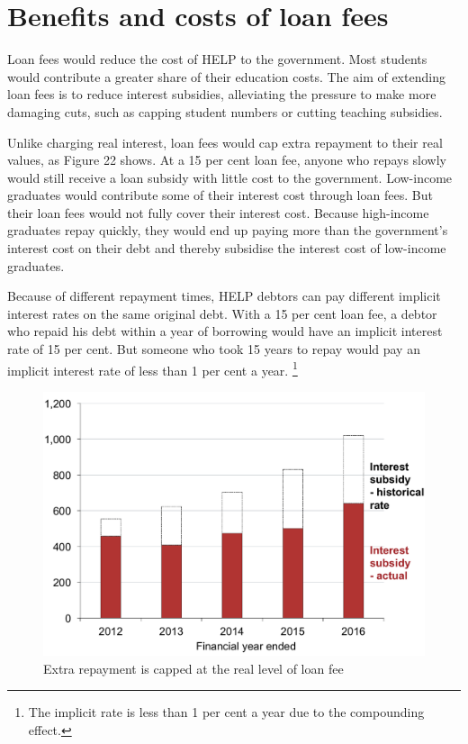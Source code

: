 \documentclass[embargoed]{grattan}
\begin{document}
\section{Benefits and costs of loan fees}\label{sec:benefits-and-costs-of-loan-fees}

Loan fees would reduce the cost of HELP to the government.
Most students would contribute a greater share of their education costs.
The aim of extending loan fees is to reduce interest subsidies, alleviating the pressure to make more damaging cuts, such as capping student numbers or cutting teaching subsidies.

Unlike charging real interest, loan fees would cap extra repayment to their real values, as Figure 22 shows.
At a 15 per cent loan fee, anyone who repays slowly would still receive a loan subsidy with little cost to the government.
Low-income graduates would contribute some of their interest cost through loan fees.
But their loan fees would not fully cover their interest cost.
Because high-income graduates repay quickly, they would end up paying more than the government's interest cost on their debt and thereby subsidise the interest cost of low-income graduates.

Because of different repayment times, HELP debtors can pay different implicit interest rates on the same original debt.
With a 15 per cent loan fee, a debtor who repaid his debt within a year of borrowing would have an implicit interest rate of 15 per cent.
But someone who took 15 years to repay would pay an implicit interest rate of less than 1 per cent a year.%
\footnote{The implicit rate is less than 1 per cent a year due to the compounding effect.}

\begin{figure}
\caption{Extra repayment is capped at the real level of loan fee}\label{fig:fig22-extra-repayment-capped-at-real-level-of-loan-fee}

\includegraphics[page=22]{atlas/Chartpack.pdf}

\end{figure}
\end{document}
